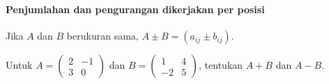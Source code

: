 \documentclass{../../kalkulus-ppt}
\begin{document}
\begin{frame}
    \frametitle{\insertsection}
    \framesubtitle{Penjumlahan dan pengurangan dikerjakan per posisi}
    \begin{definisi}
        Jika $A$ dan $B$ berukuran sama, $A\pm B=(a_{ij}\pm b_{ij})$.
    \end{definisi}
    \begin{contoh}
        Untuk $A=\begin{pmatrix}2&-1\\3&0\end{pmatrix}$ dan
        $B=\begin{pmatrix}1&4\\-2&5\end{pmatrix}$, tentukan $A+B$ dan $A-B$.
    \end{contoh}
\end{frame}
\end{document}
